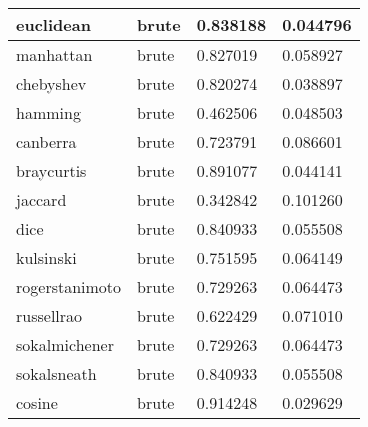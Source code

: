 \begin{table}
\begin{tabular}{|l|l|l|l|}
    euclidean & brute & 0.838188 & 0.044796 \\\hline
    manhattan & brute & 0.827019 & 0.058927 \\\hline
    chebyshev & brute & 0.820274 & 0.038897 \\\hline
    hamming & brute & 0.462506 & 0.048503 \\\hline
    canberra & brute & 0.723791 & 0.086601 \\\hline
    braycurtis & brute & 0.891077 & 0.044141 \\\hline
    jaccard & brute & 0.342842 & 0.101260 \\\hline
    dice & brute & 0.840933 & 0.055508 \\\hline
    kulsinski & brute & 0.751595 & 0.064149 \\\hline
    rogerstanimoto & brute & 0.729263 & 0.064473 \\\hline
    russellrao & brute & 0.622429 & 0.071010 \\\hline
    sokalmichener & brute & 0.729263 & 0.064473 \\\hline
    sokalsneath & brute & 0.840933 & 0.055508 \\\hline
    cosine & brute & 0.914248 & 0.029629 \\\hline
  \end{tabular}
  \tableSpace
\end{table}

